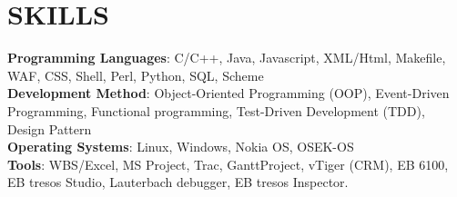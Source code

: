 
\section{SKILLS}
\textbf{Programming Languages}: C/C++, Java, Javascript, XML/Html, Makefile, WAF, CSS, Shell, Perl, Python, SQL, Scheme\\
\textbf{Development Method}:
Object-Oriented Programming (OOP),
Event-Driven Programming,
Functional programming,
Test-Driven Development (TDD),
Design Pattern\\
\textbf{Operating Systems}: Linux, Windows, Nokia OS, OSEK-OS\\
\textbf{Tools}: WBS/Excel, MS Project, Trac, GanttProject, vTiger (CRM),
EB 6100, EB tresos Studio, Lauterbach debugger, EB tresos Inspector. \\

